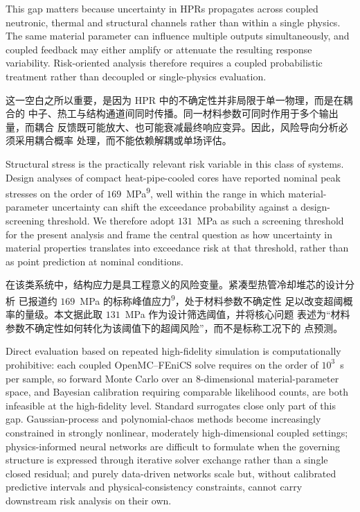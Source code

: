 \documentclass[11pt,a4paper]{article}
\begin{document}
This gap matters because uncertainty in HPRs propagates across coupled
neutronic, thermal and structural channels rather than within a single physics.
The same material parameter can influence multiple outputs simultaneously, and
coupled feedback may either amplify or attenuate the resulting response
variability. Risk-oriented analysis therefore requires a coupled probabilistic
treatment rather than decoupled or single-physics evaluation.

这一空白之所以重要，是因为 HPR 中的不确定性并非局限于单一物理，而是在耦合的
中子、热工与结构通道间同时传播。同一材料参数可同时作用于多个输出量，而耦合
反馈既可能放大、也可能衰减最终响应变异。因此，风险导向分析必须采用耦合概率
处理，而不能依赖解耦或单场评估。

Structural stress is the practically relevant risk variable in this class of
systems. Design analyses of compact heat-pipe-cooled cores have reported
nominal peak stresses on the order of $169$~MPa\textsuperscript{9}, well
within the range in which material-parameter uncertainty can shift the
exceedance probability against a design-screening threshold. We therefore
adopt $131$~MPa as such a screening threshold for the present analysis and
frame the central question as how uncertainty in material properties
translates into exceedance risk at that threshold, rather than as point
prediction at nominal conditions.

在该类系统中，结构应力是具工程意义的风险变量。紧凑型热管冷却堆芯的设计分析
已报道约 $169$~MPa 的标称峰值应力\textsuperscript{9}，处于材料参数不确定性
足以改变超阈概率的量级。本文据此取 $131$~MPa 作为设计筛选阈值，并将核心问题
表述为``材料参数不确定性如何转化为该阈值下的超阈风险''，而不是标称工况下的
点预测。

Direct evaluation based on repeated high-fidelity simulation is computationally
prohibitive: each coupled OpenMC--FEniCS solve requires on the order of
$10^{3}$~s per sample, so forward Monte Carlo over an 8-dimensional
material-parameter space, and Bayesian calibration requiring comparable
likelihood counts, are both infeasible at the high-fidelity level. Standard
surrogates close only part of this gap. Gaussian-process and polynomial-chaos
methods become increasingly constrained in strongly nonlinear, moderately
high-dimensional coupled settings; physics-informed neural networks are
difficult to formulate when the governing structure is expressed through
iterative solver exchange rather than a single closed residual; and purely
data-driven networks scale but, without calibrated predictive intervals and
physical-consistency constraints, cannot carry downstream risk analysis on
their own.
\end{document}
